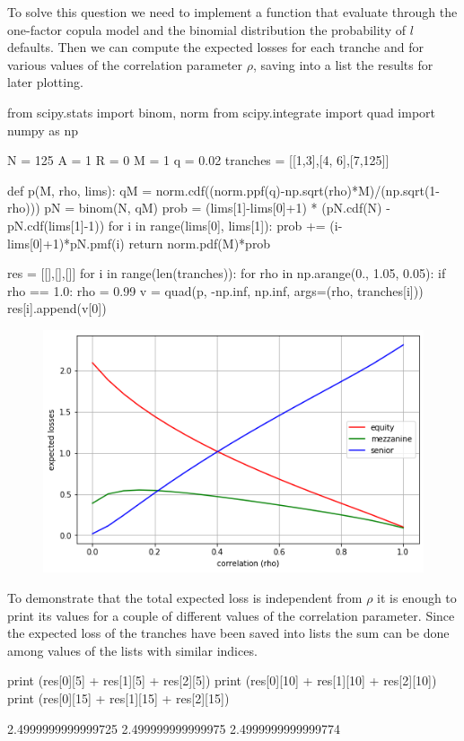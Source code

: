 \cprotEnv\begin{solution}	
To solve this question we need to implement a function that evaluate through the one-factor copula model and the binomial distribution the probability of $l$ defaults.
Then we can compute the expected losses for each tranche and for various values of the correlation parameter $\rho$, saving into a list the results for later plotting.

\begin{ipython}
from scipy.stats import binom, norm
from scipy.integrate import quad
import numpy as np

N = 125
A = 1
R = 0
M = 1
q = 0.02
tranches = [[1,3],[4, 6],[7,125]]

def p(M, rho, lims):
    qM = norm.cdf((norm.ppf(q)-np.sqrt(rho)*M)/(np.sqrt(1-rho)))
    pN = binom(N, qM)
    prob = (lims[1]-lims[0]+1) * (pN.cdf(N) - pN.cdf(lims[1]-1))
    for i in range(lims[0], lims[1]):
        prob += (i-lims[0]+1)*pN.pmf(i)
    return norm.pdf(M)*prob

res = [[],[],[]]
for i in range(len(tranches)):
    for rho in np.arange(0., 1.05, 0.05):
        if rho == 1.0:
            rho = 0.99
        v = quad(p, -np.inf, np.inf, args=(rho, tranches[i]))
        res[i].append(v[0])
\end{ipython}

\begin{figure}[htbp]
	\begin{center}		
		\includegraphics[width=0.7\linewidth]{figures/losses_vs_rho_2}
	\end{center}
\end{figure}

To demonstrate that the total expected loss is independent from $\rho$ it is enough to print its values for a couple of different values of the correlation parameter. Since the expected loss of the tranches have been saved into lists the sum can be done among values of the lists with similar indices. 

\begin{ipython}
print (res[0][5] + res[1][5] + res[2][5])
print (res[0][10] + res[1][10] + res[2][10])
print (res[0][15] + res[1][15] + res[2][15])

2.4999999999999725
2.499999999999975
2.4999999999999774
\end{ipython}
\end{solution}

